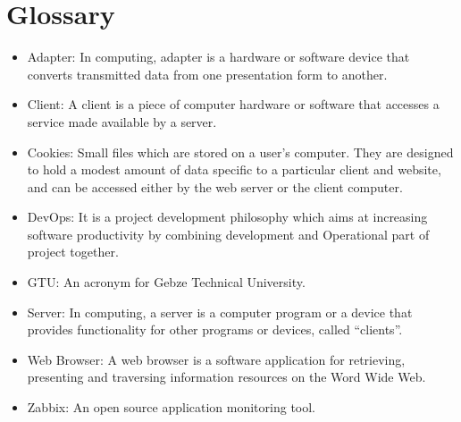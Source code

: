 \documentclass{article}
\begin{document}
\section{Glossary} 
\begin{itemize}
	\item	Adapter: In computing, adapter is a hardware or software device that converts transmitted data from one presentation form to another.
	\item 	Client: A client is a piece of computer hardware or software that accesses a service made available by a server.
 	\item Cookies: Small files which are stored on a user's computer. They are  designed to hold a modest amount of data specific to a particular client and website, and can be accessed either by the web server or the client computer.
	\item DevOps: It is a project development philosophy which aims at increasing software         
            productivity by combining development and Operational part of project  together.
	\item GTU: An acronym for Gebze Technical University.
	\item Server: In computing, a server is a computer program or a device that provides functionality for other programs or devices, called “clients”.

	\item	Web Browser: A web browser is a software application for retrieving, presenting and traversing information resources on the Word Wide Web.
	\item	Zabbix: An open source application monitoring tool.

\end{itemize}


	
	
\end{document}
